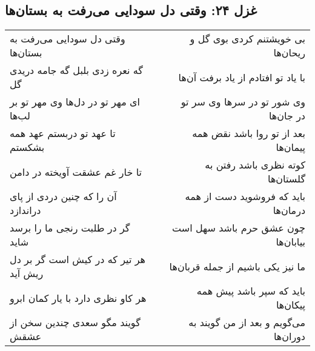 \begin{center}
\section*{غزل ۲۴: وقتی دل سودایی می‌رفت به بستان‌ها}
\label{sec:024}
\begin{longtable}{l p{0.5cm} r}
وقتی دل سودایی می‌رفت به بستان‌ها
&&
بی خویشتنم کردی بوی گل و ریحان‌ها
\\
گه نعره زدی بلبل گه جامه دریدی گل
&&
با یاد تو افتادم از یاد برفت آن‌ها
\\
ای مهر تو در دل‌ها وی مهر تو بر لب‌ها
&&
وی شور تو در سرها وی سر تو در جان‌ها
\\
تا عهد تو دربستم عهد همه بشکستم
&&
بعد از تو روا باشد نقض همه پیمان‌ها
\\
تا خار غم عشقت آویخته در دامن
&&
کوته نظری باشد رفتن به گلستان‌ها
\\
آن را که چنین دردی از پای دراندازد
&&
باید که فروشوید دست از همه درمان‌ها
\\
گر در طلبت رنجی ما را برسد شاید
&&
چون عشق حرم باشد سهل است بیابان‌ها
\\
هر تیر که در کیش است گر بر دل ریش آید
&&
ما نیز یکی باشیم از جمله قربان‌ها
\\
هر کاو نظری دارد با یار کمان ابرو
&&
باید که سپر باشد پیش همه پیکان‌ها
\\
گویند مگو سعدی چندین سخن از عشقش
&&
می‌گویم و بعد از من گویند به دوران‌ها
\\
\end{longtable}
\end{center}
